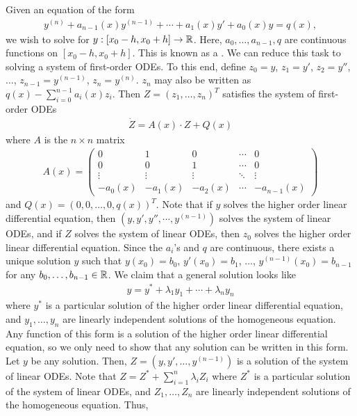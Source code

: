 Given an equation of the form
\begin{align}
    y^{(n)} + a_{n-1}(x) y^{(n-1)} + \cdots + a_{1}(x) y' + a_{0}(x) y = q(x),
\end{align}
we wish to solve for $y:[x_{0}-h,x_{0}+h] \to \mathbb{R}$. Here, $a_{0},\ldots,a_{n-1},q$ are continuous functions on $[x_{0}-h,x_{0}+h]$. This is known as a . We can reduce this task to solving a system of first-order ODEs. To this end, define $z_{0} = y$, $z_{1} = y'$, $z_{2} = y''$, $\ldots$, $z_{n-1} = y^{(n-1)}$, $z_{n} = y^{(n)}$. $z_{n}$ may also be written as $q(x) - \sum_{i=0}^{n-1} a_{i}(x) z_{i}$. Then $Z = (z_{1},\ldots,z_{n})^{T}$ satisfies the system of first-order ODEs
\begin{align}
    \dot{Z} = A(x) \cdot Z + Q(x)
\end{align}
where $A$ is the $n \times n$ matrix
\begin{align}
    A(x) = \begin{pmatrix}
        0 & 1 & 0 & \cdots & 0 \\
        0 & 0 & 1 & \cdots & 0 \\
        \vdots & \vdots & \vdots & \ddots & \vdots \\
        -a_{0}(x) & -a_{1}(x) & -a_{2}(x) & \cdots & -a_{n-1}(x)
    \end{pmatrix}
\end{align}
and $Q(x) = (0,0,\ldots,0,q(x))^{T}$. Note that if $y$ solves the higher order linear differential equation, then $(y,y',y'',\cdots,y^{(n-1)})$ solves the system of linear ODEs, and if $Z$ solves the system of linear ODEs, then $z_{0}$ solves the higher order linear differential equation. Since the $a_{i}$'s and $q$ are continuous, there exists a unique solution $y$ such that $y(x_{0}) = b_{0}$, $y'(x_{0}) = b_{1}$, $\ldots$, $y^{(n-1)}(x_{0}) = b_{n-1}$ for any $b_{0},\ldots,b_{n-1} \in \mathbb{R}$. We claim that a general solution looks like
\begin{align}
    y = y^{\ast} + \lambda_{1} y_{1} + \cdots + \lambda_{n} y_{n}
\end{align}
where $y^{\ast}$ is a particular solution of the higher order linear differential equation, and $y_{1},\ldots,y_{n}$ are linearly independent solutions of the homogeneous equation. Any function of this form is a solution of the higher order linear differential equation, so we only need to show that any solution can be written in this form. Let $y$ be any solution. Then, $Z = (y,y',\ldots,y^{(n-1)})$ is a solution of the system of linear ODEs. Note that $Z = Z^{\ast} + \sum_{i=1}^{n} \lambda_{i} Z_{i}$ where $Z^{\ast}$ is a particular solution of the system of linear ODEs, and $Z_{1},\ldots,Z_{n}$ are linearly independent solutions of the homogeneous equation. Thus,
